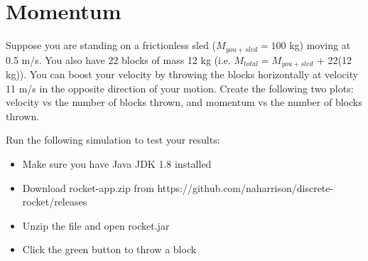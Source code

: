 \section{Momentum}

Suppose you are standing on a frictionless sled ($M_{you+sled} = 100$ kg) moving at 0.5 m/s.
You also have 22 blocks of mass 12 kg (i.e. $M_{total} = M_{you+sled}$ + 22(12 kg)).
You can boost your velocity by throwing the blocks horizontally at velocity 11 m/s in the opposite direction of your motion.
Create the following two plots: velocity vs the number of blocks thrown, and momentum vs the number of blocks thrown.
\hfill \break

Run the following simulation to test your results:
\begin{itemize}
\item Make sure you have Java JDK 1.8 installed
\item Download rocket-app.zip from https://github.com/naharrison/discrete-rocket/releases
\item Unzip the file and open rocket.jar
\item Click the green button to throw a block
\end{itemize}

\pagebreak \clearpage
